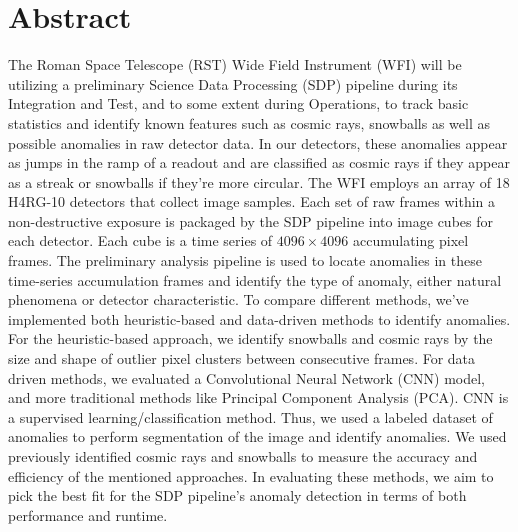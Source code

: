 \section{Abstract}
The Roman Space Telescope (RST) Wide Field Instrument (WFI) will be utilizing a preliminary Science Data Processing (SDP) pipeline during its Integration and Test, and to some extent during Operations, to track basic statistics and identify known features such as cosmic rays, snowballs as well as possible anomalies in raw detector data. 
In our detectors, these anomalies appear as jumps in the ramp of a readout and are classified as cosmic rays if they appear as a streak or snowballs if they're more circular. 
The WFI employs an array of 18 H4RG-10 detectors that collect image samples.
Each set of raw frames within a non-destructive exposure is packaged by the SDP pipeline into image cubes for each detector.
Each cube is a time series of $4096 \times 4096$ accumulating pixel frames.
The preliminary analysis pipeline is used to locate anomalies in these time-series accumulation frames and identify the type of anomaly, either natural phenomena or detector characteristic.
To compare different methods, we've implemented both heuristic-based and data-driven methods to identify anomalies.
For the heuristic-based approach, we identify snowballs and cosmic rays by the size and shape of outlier pixel clusters between consecutive frames.
For data driven methods, we evaluated a Convolutional Neural Network (CNN) model, and more traditional methods like Principal Component Analysis (PCA).
CNN is a supervised learning/classification method. 
Thus, we used a labeled dataset of anomalies to perform segmentation of the image and identify anomalies. 
We used previously identified cosmic rays and snowballs to measure the accuracy and efficiency of the mentioned approaches. 
In evaluating these methods, we aim to pick the best fit for the SDP pipeline's anomaly detection in terms of both performance and runtime. 

